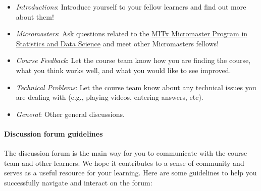 \documentclass[pdftex, brazil, 12pt, twoside]{article}
\begin{document}
\begin{itemize}[noitemsep]
\item \emph{Introductions}: Introduce yourself to your fellow learners and find
  out more about them!
\item \emph{Micromasters}: Ask questions related to the
  \href{https://www.edx.org/micromasters/mitx-statistics-and-data-science}{MITx
    Micromaster Program in Statistics and Data Science} and meet other Micromasters
  fellows!
\item \emph{Course Feedback}: Let the course team know how you are finding the course,
  what you think works well, and what you would like to see improved.
\item \emph{Technical Problems}: Let the course team know about any technical issues
  you are dealing with (e.g., playing videos, entering answers, etc).
\item \emph{General}: Other general discussions.
\end{itemize}

\paragraph{Discussion forum guidelines} The discussion forum is the main way for you
to communicate with the course team and other learners. We hope it contributes to a
sense of community and serves as a useful resource for your learning. Here are some
guidelines to help you successfully navigate and interact on the forum:
\end{document}
